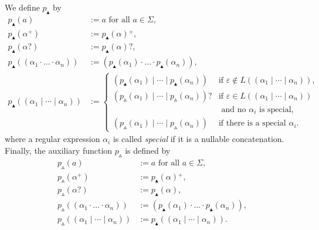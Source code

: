 \documentclass[a4paper,11pt, svgnames,titlepage]{article}
\newcommand{\rxp}{{^\mathtt{+}}}
\newcommand{\rxo}{\mathtt{?}}
\newcommand{\rxc}{\cdot}
\DeclareMathOperator{\ror}{\mathtt{|}}
\newcommand{\emptyword}{\varepsilon}
\newcommand{\df}{:=}
\newcommand{\pnfupfun}{p_{\blacktriangle}}
\newcommand{\pnfuphfun}{p_{\vartriangle}}
\newcommand{\rulefivefun}{p_{R}}
\newcommand{\rulefive}[1]{\rulefivefun{\left(#1\right)}}
\newcommand{\pnfup}[1]{\pnfupfun{\left(#1\right)}}
\newcommand{\pnfuph}[1]{\pnfuphfun{\left(#1\right)}}
\begin{document}
We define $\pnfupfun$ by
\begin{align*}
	\pnfup{a}&\df a \text{ for all $a\in \Sigma$},\\
	\pnfup{\alpha\rxp}
		&\df \pnfup{\alpha}\rxp,\\
	\pnfup{\alpha\rxo}
		&\df \pnfup{\alpha}\rxo,\\
	\pnfup{(\alpha_1\rxc \ldots \rxc \alpha_n)}
		&\df (\pnfup{\alpha_1}\rxc \ldots \rxc \pnfup{\alpha_n}),\\
	\pnfup{(\alpha_1\ror \cdots \ror \alpha_n)}
		&\df \begin{cases}
			(\pnfup{\alpha_1}\ror \cdots \ror \pnfup{\alpha_n}) & \text{if $\emptyword\notin L((\alpha_1\ror \cdots \ror \alpha_n))$},\\
			(\pnfuph{\alpha_1}\ror \cdots \ror \pnfuph{\alpha_n})\rxo & \text{if $\emptyword\in L((\alpha_1\ror \cdots \ror \alpha_n))$}\\
			& \text{ and no $\alpha_i$ is special},\\
			(\pnfuph{\alpha_1}\ror \cdots \ror \pnfuph{\alpha_n})& \text{if there is a special $\alpha_i$}.
		\end{cases}
\end{align*}
where a regular expression $\alpha_i$ is called \emph{special} if it is a nullable concatenation.
Finally, the auxiliary function $\pnfuphfun$ is defined by
\begin{align*}
	\pnfuph{a}&\df a \text{ for all $a\in \Sigma$},\\
	\pnfuph{\alpha\rxp}
		&\df \pnfup{\alpha}\rxp,\\
	\pnfuph{\alpha\rxo}
		&\df \pnfup{\alpha},\\
	\pnfuph{(\alpha_1\rxc \ldots \rxc \alpha_n)}
		&\df (\pnfup{\alpha_1}\rxc \ldots \rxc \pnfup{\alpha_n}),\\
	\pnfuph{(\alpha_1\ror \cdots \ror \alpha_n)}
		&\df \pnfup{(\alpha_1\ror \cdots \ror \alpha_n)}.
\end{align*}
\end{document}
